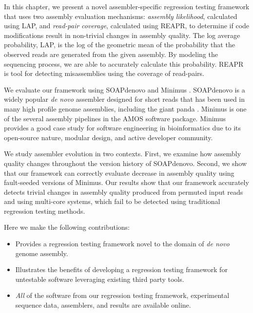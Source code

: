 \documentclass[12pt,\mydriver]{thesis}
\begin{document}
In this chapter, we present a novel assembler-specific regression testing
framework that uses two assembly evaluation mechanisms: \emph{assembly likelihood}, calculated using LAP\cite{LAP}, and \emph{read-pair coverage}, calculated using REAPR\cite{hunt2013reapr}, to determine if code modifications result in non-trivial
changes in assembly quality. The log average probability, LAP, is
the log of the geometric mean of the probability that the observed reads are generated from the given assembly.
By modeling the sequencing process, we are able to accurately calculate this probability. REAPR is
tool for detecting misassemblies using the coverage of read-pairs.

We evaluate our framework using SOAPdenovo \cite{li2010novo} and Minimus \cite{sommer2007minimus}.
SOAPdenovo is a widely popular \emph{de novo} assembler designed for short reads that has been used in many high profile genome assemblies, including the giant panda \cite{li2009sequence}.
Minimus is one of the several assembly pipelines in the AMOS software package.
Minimus provides a good case study for software engineering in bioinformatics due to its open-source nature, modular design, and active developer community.

We study assembler evolution in two contexts. First,
we examine how assembly quality changes
throughout the version history of SOAPdenovo. Second,
we show that our framework can correctly evaluate decrease in assembly quality
using fault-seeded versions of Minimus.
Our results show that our framework accurately detects trivial
changes in assembly quality produced from permuted input reads and using
multi-core systems, which fail to be detected using traditional regression
testing methods.

Here we make the following contributions:

\begin{itemize}

\item
Provides a regression testing framework novel to the domain of \emph{de novo} genome assembly.

\item
Illustrates the benefits of developing a regression testing framework for untestable software leveraging existing third party tools.

\item
\emph{All} of the software from our regression testing framework, experimental sequence data, assemblers, and results are available online.

\end{itemize}
\end{document}
